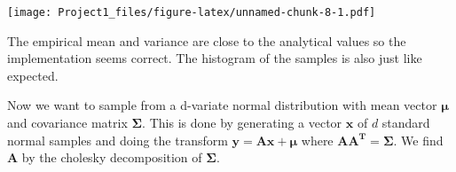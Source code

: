 \documentclass[]{article}
\newenvironment{Shaded}{\begin{snugshade}}{\end{snugshade}}
\newcommand{\DataTypeTok}[1]{\textcolor[rgb]{0.13,0.29,0.53}{#1}}
\newcommand{\FloatTok}[1]{\textcolor[rgb]{0.00,0.00,0.81}{#1}}
\newcommand{\KeywordTok}[1]{\textcolor[rgb]{0.13,0.29,0.53}{\textbf{#1}}}
\newcommand{\NormalTok}[1]{#1}
\newcommand{\OperatorTok}[1]{\textcolor[rgb]{0.81,0.36,0.00}{\textbf{#1}}}
\newcommand{\StringTok}[1]{\textcolor[rgb]{0.31,0.60,0.02}{#1}}
\begin{document}
\begin{Shaded}
\end{Shaded}

\texttt{[image: Project1\_files/figure-latex/unnamed-chunk-8-1.pdf]}

The empirical mean and variance are close to the analytical values so
the implementation seems correct. The histogram of the samples is also
just like expected.

Now we want to sample from a d-variate normal distribution with mean
vector \(\boldsymbol{\mu}\) and covariance matrix \(\mathbf{\Sigma}\).
This is done by generating a vector \(\boldsymbol{x}\) of \(d\) standard
normal samples and doing the transform
\(\boldsymbol{y}=\mathbf{A}\boldsymbol{x}+\boldsymbol{\mu}\) where
\(\mathbf{AA^T=\Sigma}\). We find \(\mathbf{A}\) by the cholesky
decomposition of \(\mathbf{\Sigma}\).
\end{document}
